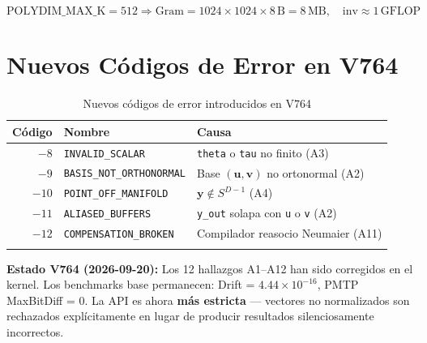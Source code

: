\begin{equation}
\text{POLYDIM\_MAX\_K} = 512 \Rightarrow \text{Gram} = 1024 \times 1024 \times 8\,\text{B} = 8\,\text{MB}, \quad \text{inv} \approx 1\,\text{GFLOP}
\end{equation}

\section{Nuevos Códigos de Error en V764}

\begin{longtable}{rll}
\toprule
\textbf{Código} & \textbf{Nombre} & \textbf{Causa} \\
\midrule
$-8$ & \texttt{INVALID\_SCALAR} & \texttt{theta} o \texttt{tau} no finito (A3) \\
$-9$ & \texttt{BASIS\_NOT\_ORTHONORMAL} & Base $(\mathbf{u}, \mathbf{v})$ no ortonormal (A2) \\
$-10$ & \texttt{POINT\_OFF\_MANIFOLD} & $\mathbf{y} \notin S^{D-1}$ (A4) \\
$-11$ & \texttt{ALIASED\_BUFFERS} & \texttt{y\_out} solapa con \texttt{u} o \texttt{v} (A2) \\
$-12$ & \texttt{COMPENSATION\_BROKEN} & Compilador reasocio Neumaier (A11) \\
\bottomrule
\caption{Nuevos códigos de error introducidos en V764}
\label{tab:v764_errors}
\end{longtable}

\begin{certifiedbox}
\textbf{Estado V764 (2026-09-20):} Los 12 hallazgos A1--A12 han sido corregidos
en el kernel. Los benchmarks base permanecen: Drift = $4.44 \times 10^{-16}$,
PMTP MaxBitDiff = 0. La API es ahora \textbf{más estricta} --- vectores no normalizados
son rechazados explícitamente en lugar de producir resultados silenciosamente incorrectos.
\end{certifiedbox}
